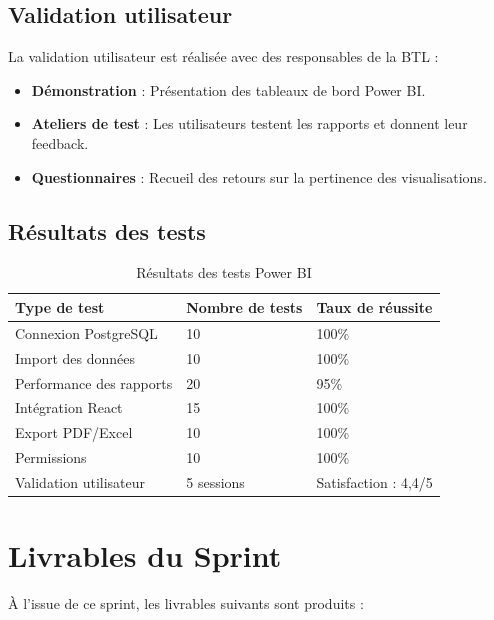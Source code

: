 \subsection{Validation utilisateur}

La validation utilisateur est réalisée avec des responsables de la BTL :

\begin{itemize}
    \item \textbf{Démonstration} : Présentation des tableaux de bord Power BI.
    \item \textbf{Ateliers de test} : Les utilisateurs testent les rapports et donnent leur feedback.
    \item \textbf{Questionnaires} : Recueil des retours sur la pertinence des visualisations.
\end{itemize}

\subsection{Résultats des tests}

\begin{table}[H]
\centering
\begin{tabular}{|p{5cm}|p{4cm}|p{4cm}|}
\hline
\textbf{Type de test} & \textbf{Nombre de tests} & \textbf{Taux de réussite} \\
\hline
Connexion PostgreSQL & 10 & 100\% \\
\hline
Import des données & 10 & 100\% \\
\hline
Performance des rapports & 20 & 95\% \\
\hline
Intégration React & 15 & 100\% \\
\hline
Export PDF/Excel & 10 & 100\% \\
\hline
Permissions & 10 & 100\% \\
\hline
Validation utilisateur & 5 sessions & Satisfaction : 4,4/5 \\
\hline
\end{tabular}
\caption{Résultats des tests Power BI}
\label{tab:powerbi-tests}
\end{table}

\section{Livrables du Sprint}
\label{sec:sprint7-livrables}

À l'issue de ce sprint, les livrables suivants sont produits :

